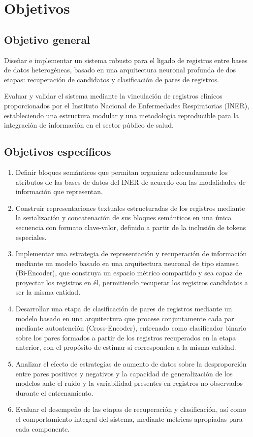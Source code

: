 \section{Objetivos}

\subsection{Objetivo general}
Diseñar e implementar un sistema robusto para el ligado de registros entre bases de datos heterogéneas, basado en una arquitectura neuronal profunda de dos etapas: recuperación de candidatos y clasificación de pares de registros.

Evaluar y validar el sistema mediante la vinculación de registros clínicos proporcionados por el Instituto Nacional de Enfermedades Respiratorias (INER), estableciendo una estructura modular y una metodología reproducible para la integración de información en el sector público de salud.

\subsection{Objetivos específicos}

\begin{enumerate}
    \item Definir bloques semánticos que permitan organizar adecuadamente los atributos de las bases de datos del INER de acuerdo con las modalidades de información que representan.
    \item Construir representaciones textuales estructuradas de los registros mediante la serialización y concatenación de sus bloques semánticos en una única secuencia con formato clave-valor, definido a partir de la inclusión de tokens especiales.
    \item Implementar una estrategia de representación y recuperación de información mediante un modelo basado en una arquitectura neuronal de tipo siamesa (Bi-Encoder), que construya un espacio métrico compartido y sea capaz de proyectar los registros en él, permitiendo recuperar los registros candidatos a ser la misma entidad.
    \item Desarrollar una etapa de clasificación de pares de registros mediante un modelo basado en una arquitectura que procese conjuntamente cada par mediante autoatención (Cross-Encoder), entrenado como clasificador binario sobre los pares formados a partir de los registros recuperados en la etapa anterior, con el propósito de estimar si corresponden a la misma entidad.
    \item Analizar el efecto de estrategias de aumento de datos sobre la desproporción entre pares positivos y negativos y la capacidad de generalización de los modelos ante el ruido y la variabilidad presentes en registros no observados durante el entrenamiento.
    \item  Evaluar el desempeño de las etapas de recuperación y clasificación, así como el comportamiento integral del sistema, mediante métricas apropiadas para cada componente.
\end{enumerate}


